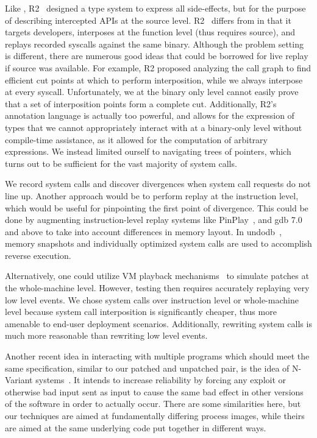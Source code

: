 Like \tachyon, R2~\cite{guo:2008} designed a type system to express all
side-effects, but for the purpose of describing intercepted APIs at
the source level.  R2~\cite{guo:2008} differs from \tachyon in
that it targets developers, interposes at the function level (thus
requires source), and replays recorded syscalls against the same
binary.  Although the problem setting is different, there are numerous
good ideas that could be borrowed for live replay if source was
available.  For example, R2 proposed analyzing the call graph to find
efficient cut points at which to perform interposition, while we
always interpose at every syscall. 
Unfortunately, we at the binary only level cannot easily prove that a
set of interposition points form a complete cut.
Additionally, R2's annotation
language is actually too powerful, and allows for the expression of types
that we cannot appropriately interact with at a binary-only level without
compile-time assistance, as it allowed for the computation of arbitrary expressions.
We instead limited ourself to navigating trees of pointers, which turns out to be
sufficient for the vast majority of system calls.

We record system calls and discover divergences when system call
requests do not line up.  Another approach would be to perform replay
at the instruction level, which would be useful for pinpointing the
first point of divergence.  This could be done by augmenting
instruction-level replay systems like PinPlay~\cite{patil:2010},
and gdb\cite{gdb} 7.0 and above to take into account differences in memory
layout.  In undodb~\cite{undodb}, memory snapshots and individually
optimized system calls are used to accomplish reverse execution.


Alternatively, one could utilize VM playback mechanisms~\cite{revirt,
  retrace, vmware-replay} to simulate patches at the whole-machine
level. However, testing then requires accurately replaying very low level events.
We chose system calls over
instruction level or whole-machine level because system call
interposition is significantly cheaper, thus more amenable to end-user
deployment scenarios. Additionally, rewriting system calls is much more reasonable
than rewriting low level events.

Another recent idea in interacting with multiple programs which should meet the
same specification, similar to our patched and unpatched pair, is the
idea of N-Variant systems~\cite{Cox2006}. It intends to increase reliability
by forcing any exploit or otherwise bad input sent as input to cause the same
bad effect in other versions of the software in order to actually occur. There
are some similarities here, but our techniques are aimed at fundamentally differing
process images, while theirs are aimed at the same underlying code put together
in different ways.

